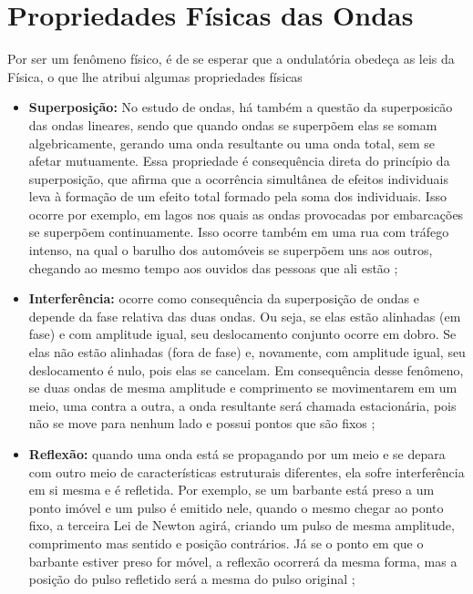 	\section{Propriedades Físicas das Ondas}
		Por ser um fenômeno físico, é de se esperar que a ondulatória obedeça as leis da Física, o que lhe atribui algumas propriedades físicas
		\begin{itemize}
			\item\textbf{Superposição: }No estudo de ondas, há também a questão da superposicão das ondas lineares, sendo que quando ondas se superpõem elas se somam algebricamente, gerando uma onda resultante ou uma onda total, sem se afetar mutuamente. Essa propriedade é consequência direta do princípio da superposição, que afirma que a ocorrência simultânea de efeitos individuais leva à formação de um efeito total formado pela soma dos individuais. Isso ocorre por exemplo, em lagos nos quais as ondas provocadas por embarcações se superpõem continuamente. Isso ocorre também em uma rua com tráfego intenso, na qual o barulho dos automóveis se superpõem uns aos outros, chegando ao mesmo tempo aos ouvidos das pessoas que ali estão \cite{halliday}; 
			
			\item\textbf{Interferência: }ocorre como consequência da superposição de ondas e depende da fase relativa das duas ondas. Ou seja, se elas estão alinhadas (em fase) e com amplitude igual, seu deslocamento conjunto ocorre em dobro. Se elas não estão alinhadas (fora de fase) e, novamente, com amplitude igual, seu deslocamento é nulo, pois elas se cancelam. Em consequência desse fenômeno, se duas ondas de mesma amplitude e comprimento se movimentarem em um meio, uma contra a outra, a onda resultante será chamada estacionária, pois não se move para nenhum lado e possui pontos que são fixos \cite{halliday}; 
			
			\item\textbf{Reflexão: }quando uma onda está se propagando por um meio e se depara com outro meio de características estruturais diferentes, ela sofre interferência em si mesma e é refletida. Por exemplo, se um barbante está preso a um ponto imóvel e um pulso é emitido nele, quando o mesmo chegar ao ponto fixo, a terceira Lei de Newton agirá, criando um pulso de mesma amplitude, comprimento mas sentido e posição contrários. Já se o ponto em que o barbante estiver preso for móvel, a reflexão ocorrerá da mesma forma, mas a posição do pulso refletido será a mesma do pulso original \cite{halliday}; 
			

\end{itemize}
